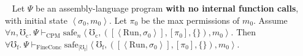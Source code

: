 \begin{theorem}
\label{thm:coarse-to-fine:special}
~\newline
Let $\Psi$ be an assembly-language program
\textbf{with no internal function calls},
with initial state $\left<\sigma_0,m_0\right>$.
Let $\pi_0$ be the max permissions of $m_0$.
Assume
$\forall n,\mho_\mathrm{c}.~
\Psi \vdash_\mathrm{CPM}
\mathrm{safe}_n\left<\mho_\mathrm{c},
([\left<\mathrm{Run},\sigma_0\right>],[\pi_0], \{\}), m_0\right>$.
\newline
Then
$\forall \mho_\mathrm{f}.~
\Psi \vdash_\mathrm{FineConc}
\mathrm{safe}_{|\mho_\mathrm{f}|}\left<\mho_\mathrm{f},
([\left<\mathrm{Run},\sigma_0\right>],[\pi_0], \{\}), m_0\right>$.
\end{theorem}
